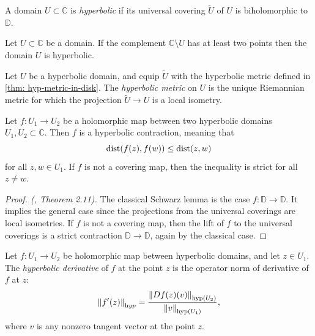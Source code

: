 \begin{definition}
	A domain $U \subset \mathbb C$ is \emph{hyperbolic} if its 
	universal covering $\tilde U$ of $U$ is biholomorphic to $\mathbb D$.
\end{definition}

\begin{theorem}\label{thm:criterion-hyperbolic-domain}
	Let $U \subset \mathbb C$ be a domain. If the complement $\mathbb C \setminus U$ has at least two points
	then the domain $U$ is hyperbolic.
\end{theorem}

\begin{definition}
	Let $U$ be a hyperbolic domain, 
	and equip $\tilde U$ with the hyperbolic metric defined in \cref{thm: hyp-metric-in-disk}.
	The \emph{hyperbolic metric} on $U$ is the unique Riemannian metric for which the projection 
	$\tilde U \to U$ is a local isometry.
\end{definition}

\begin{theorem} \label{thm:Schwarz}
	Let $f:U_1 \to U_2$ be a holomorphic map between two hyperbolic domains $U_1,U_2 \subset \mathbb C$.
	Then $f$ is a hyperbolic contraction, meaning that
	\begin{equation}
		\operatorname{dist}(f(z),f(w)) \leq \operatorname{dist} (z,w)
	\end{equation}
	for all $z,w \in U_1$. If $f$ is not a covering map, then the inequality is strict for all $z \neq w$.
\end{theorem}

\begin{proof}[Proof. (\cite{milnor_book}, Theorem 2.11)]
	The classical Schwarz lemma is the case $f:\mathbb D \to \mathbb D$.
	It implies the general case since the projections from the universal coverings 
	are local isometries.
	If $f$ is not a covering map, then the lift of $f$
	to the universal coverings is a strict contraction $\mathbb D \to \mathbb D$, 
	again by the classical case.
\end{proof}

\begin{definition}
	Let $f:U_1\to U_2$ be holomorphic map between hyperbolic domains, and 
	let $z\in U_1$. The \emph{hyperbolic derivative} of $f$ at the point $z$ 
	is the operator norm of derivative of $f$
	at $z$:
	\begin{equation} \label{def:hyp-derivative}
		\left\Vert f'(z)\right\Vert_{\mathrm hyp} = 
		\frac{\left\Vert Df(z)(v)\right\Vert_{\mathrm{hyp}(U_2)}}
		{\left\Vert v\right\Vert_{\mathrm{hyp}(U_1)}},
	\end{equation}
	where $v$ is any nonzero tangent vector at the point $z$.
\end{definition}

